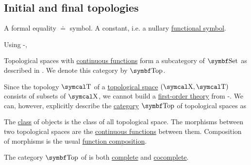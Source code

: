 \subsection{Initial and final topologies}\label{subsec:initial_final_topologies}

\begin{definition}\label{def:theory_of_topological_spaces}
  \begin{DefEnum}
     A formal equality \( \doteq \) symbol.
     A constant, i.e. a nullary \hyperref[def:first_order_logic_language/func]{functional symbol}.
  \end{DefEnum}

  Using -,

  Topological spaces with \hyperref[def:global_continuity]{continuous functions} form a subcategory of \( \Cat{Set} \) as described in . We denote this category by \( \Cat{Top} \).
\end{definition}

\begin{definition}\label{def:category_of_topological_spaces}
  Since the topology \( \CT \) of a \hyperref[def:topological_space]{topological space} \( (\CX, \CT) \) consists of subsets of \( \CX \), we cannot build a \hyperref[def:first_order_theory]{first-order theory} from -. We can, however, explicitly describe the \hyperref[def:category]{category} \( \Cat{Top} \) of topological spaces as
  \begin{RefList}
     The \hyperref[def:set_zfc]{class} of objects is the class of all topological space.
     The morphisms between two topological spaces are the \hyperref[def:global_continuity]{continuous functions} between them.
     Composition of morphisms is the usual \hyperref[def:function/composition]{function composition}.
  \end{RefList}
\end{definition}

\begin{theorem}\label{thm:top_complete_cocomplete}
  The category \( \Cat{Top} \) of is both \hyperref[def:categorical_limit]{complete} and \hyperref[def:categorical_colimit]{cocomplete}.
\end{theorem}

